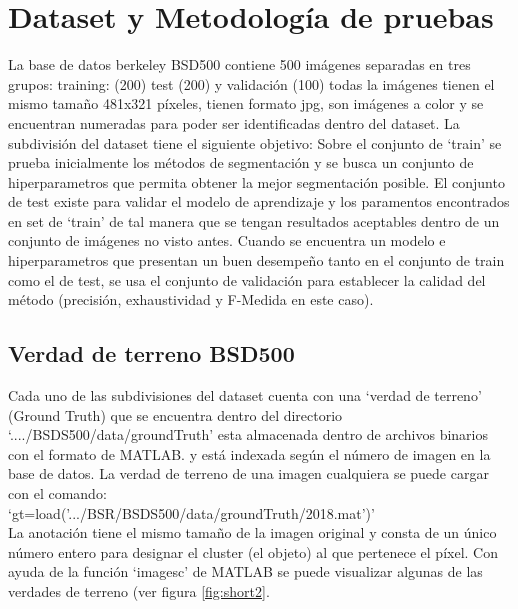\documentclass[10pt,twocolumn,letterpaper]{article}
\begin{document}
\section{Dataset y Metodología de pruebas}

La base de datos berkeley BSD500 contiene 500 imágenes  separadas en tres  grupos: training: (200) test (200) y validación (100) todas la imágenes tienen el mismo tamaño 481x321 píxeles, tienen formato jpg, son imágenes a color y se encuentran numeradas para poder ser identificadas dentro del dataset.
La subdivisión del dataset tiene el siguiente objetivo: Sobre el conjunto de ‘train’ se prueba inicialmente los métodos de segmentación y se busca un conjunto de  hiperparametros que permita obtener la mejor segmentación posible. El conjunto de test existe para validar el modelo de aprendizaje y los paramentos encontrados en set de ‘train’ de tal manera que se tengan resultados aceptables dentro de un conjunto de imágenes no visto antes. Cuando se encuentra un modelo e hiperparametros que presentan un buen desempeño tanto en el conjunto de train como el de test, se usa el conjunto de validación para establecer la calidad del método (precisión, exhaustividad y F-Medida en este caso).

\subsection{Verdad de terreno BSD500}

Cada uno de las subdivisiones del dataset cuenta con una ‘verdad de terreno’ (Ground Truth) que se encuentra dentro del directorio ‘..../BSDS500/data/groundTruth’ esta almacenada dentro de archivos binarios con el formato de MATLAB. y está indexada según el número de imagen en la base de datos.  La verdad de terreno de una imagen cualquiera se puede cargar con el comando:\\

‘gt=load('.../BSR/BSDS500/data/groundTruth/2018.mat')’\\

La anotación tiene el mismo tamaño de la imagen original y consta de un único número entero para designar el cluster (el objeto) al que pertenece el píxel. Con ayuda de la función ‘imagesc’ de MATLAB se puede visualizar algunas de las verdades de terreno (ver figura \ref{fig:short2}.
\end{document}
